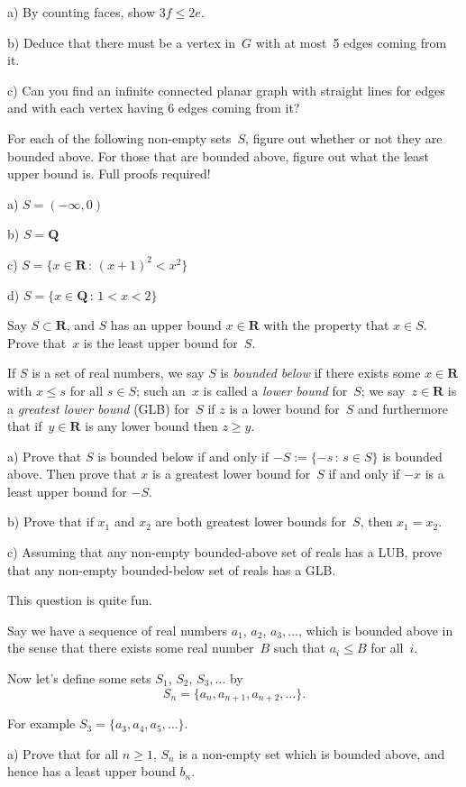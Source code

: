 \documentclass[10pt]{article}
\newcommand{\R}{\mathbf{R}}
\newcommand{\Q}{\mathbf{Q}}
\begin{document}
a) By counting faces, show $3f\leq 2e$. 

b) Deduce that there must be a vertex in~$G$ with at most~5 edges coming from it. 

c) Can you find an infinite connected planar graph with straight lines for edges and with each vertex having 6 edges coming from it?

\medskip{} For each of the following non-empty sets~$S$, figure out whether or not they are bounded above. For those that are bounded above, figure out what the least upper bound is. Full proofs required!

a) $S=(-\infty,0)$

b) $S=\Q$

c) $S=\{x\in\R\,:\,(x+1)^2<x^2\}$

d) $S=\{x\in\Q\,:\,1<x<2\}$

\medskip{} Say $S\subset\R$, and $S$ has an upper bound $x\in\R$ with the property that $x\in S$. Prove that~$x$ is the least upper bound for~$S$.

\medskip{} If $S$ is a set of real numbers, we say $S$ is \emph{bounded below} if there exists some $x\in\R$ with $x\leq s$ for all $s\in S$; such an~$x$ is called a \emph{lower bound} for~$S$; we say~$z\in\R$ is a \emph{greatest lower bound} (GLB) for~$S$ if $z$ is a lower bound for~$S$ and furthermore that if~$y\in\R$ is any lower bound then $z\geq y$.

a) Prove that $S$ is bounded below if and only if $-S:=\{-s\,:\,s\in S\}$ is bounded above. Then prove that $x$ is a greatest lower bound for~$S$ if and only if $-x$ is a least upper bound for $-S$.

b) Prove that if $x_1$ and $x_2$ are both greatest lower bounds for~$S$, then $x_1=x_2$.

c) Assuming that any non-empty bounded-above set of reals has a LUB, prove that any non-empty bounded-below set of reals has a GLB.

\medskip{} This question is quite fun.

Say we have a sequence of real numbers $a_1$, $a_2$, $a_3,\ldots$, which is bounded above in the sense that there exists some real number~$B$ such that $a_i\leq B$ for all~$i$.

Now let's define some sets $S_1$, $S_2$, $S_3,\ldots$ by
$$S_n=\{a_n,a_{n+1},a_{n+2},\ldots\}.$$

For example $S_3=\{a_3,a_4,a_5,\ldots\}$.

a) Prove that for all $n\geq1$, $S_n$ is a non-empty set which is bounded above, and hence has a least upper bound $b_n$.
\end{document}
